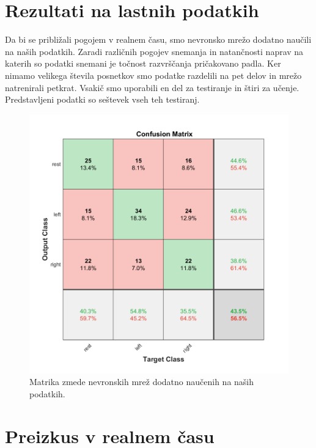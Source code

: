 \section{Rezultati na lastnih podatkih}
Da bi se približali pogojem v realnem času, smo nevronsko mrežo dodatno naučili na naših podatkih. Zaradi različnih pogojev snemanja in natančnosti naprav na katerih so podatki snemani je točnost razvrščanja pričakovano padla. Ker nimamo velikega števila posnetkov smo podatke razdelili na pet delov in mrežo natrenirali petkrat. Vsakič smo uporabili en del za testiranje in štiri za učenje. Predstavljeni podatki so seštevek vseh teh testiranj.
\begin{figure}
\begin{center}
\includegraphics[width=0.8\linewidth]{slike/Confusion_13-20Hz_0s-4s_retrained.png}
\end{center}
\caption{Matrika zmede nevronskih mrež dodatno naučenih na naših podatkih.}
\end{figure}


\section{Preizkus v realnem času}





